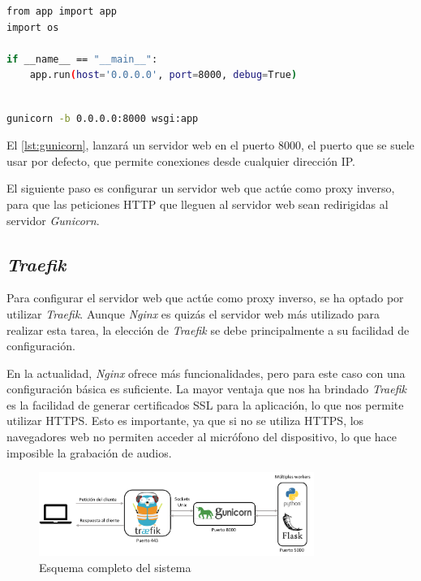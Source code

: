 \begin{lstlisting}[language=bash, caption={Código guardado en 'wsgi.py'.}, label={lst:wsgi}]
from app import app
import os

if __name__ == "__main__":
    app.run(host='0.0.0.0', port=8000, debug=True)
    

\end{lstlisting}

\begin{lstlisting}[language=bash, caption={Comando para lanzar la aplicación con \textit{Gunicorn}.}, label={lst:gunicorn}]
    gunicorn -b 0.0.0.0:8000 wsgi:app
\end{lstlisting}

El \autoref{lst:gunicorn}, lanzará un servidor web en el puerto 8000, el puerto que se suele usar por defecto, que permite conexiones desde cualquier dirección IP.

El siguiente paso es configurar un servidor web que actúe como proxy inverso, para que las peticiones HTTP que lleguen al servidor web sean redirigidas al servidor \textit{Gunicorn}.


\subsection{\textit{Traefik}}
Para configurar el servidor web que actúe como proxy inverso, se ha optado por utilizar \textit{Traefik}.
Aunque \textit{Nginx} es quizás el servidor web más utilizado para realizar esta tarea, la elección de \textit{Traefik} se debe principalmente a su facilidad de configuración.

En la actualidad, \textit{Nginx} ofrece más funcionalidades, pero para este caso con una configuración básica es suficiente.
La mayor ventaja que nos ha brindado \textit{Traefik} es la facilidad de generar certificados SSL para la aplicación, lo que nos permite utilizar HTTPS.
Esto es importante, ya que si no se utiliza HTTPS, los navegadores web no permiten acceder al micrófono del dispositivo, lo que hace imposible la grabación de audios.

\begin{figure}[htpb]
    \centering
    \includegraphics[width=0.8\textwidth]{cap3/images/arquitectura.png}
    \caption{Esquema completo del sistema}
    \label{fig:traefik}
    
\end{figure}



